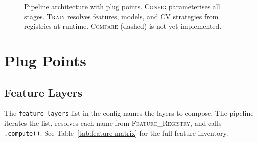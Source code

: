 \begin{figure}[htbp]
{%
}
\caption{Pipeline architecture with plug points.
\textsc{Config} parameterises all stages.
\textsc{Train} resolves features, models, and CV strategies from registries at runtime.
\textsc{Compare} (dashed) is not yet implemented.}
\label{fig:pipeline-plugpoints}
\end{figure}


\section{Plug Points}
\label{sec:plug-points}

\subsection{Feature Layers}

The \texttt{feature\_layers} list in the config names the layers to compose.
The pipeline iterates the list, resolves each name from \textsc{Feature\_Registry}, and calls \texttt{.compute()}.
See Table~\ref{tab:feature-matrix} for the full feature inventory.

